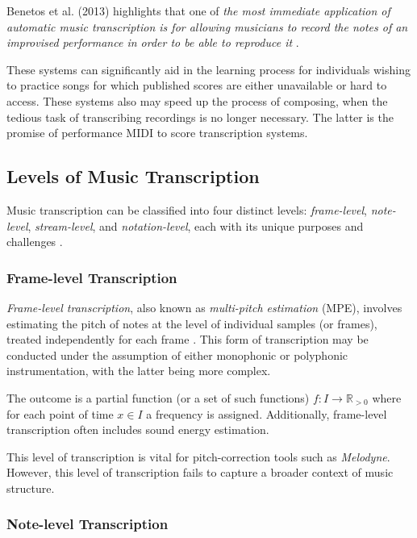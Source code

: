 Benetos et al. (2013) highlights that one of \emph{the most immediate application of automatic music transcription is for allowing musicians to record the notes of an improvised performance in order to be able to reproduce it} \cite{Benetos2013}.

These systems can significantly aid in the learning process for individuals wishing to practice songs for which published scores are either unavailable or hard to access. These systems also may speed up the process of composing, when the tedious task of transcribing recordings is no longer necessary. The latter is the promise of performance MIDI to score transcription systems.

\subsection{Levels of Music Transcription}

Music transcription can be classified into four distinct levels: \emph{frame-level}, \emph{note-level}, \emph{stream-level}, and \emph{notation-level}, each with its unique purposes and challenges \cite{Benetos2019}.

\subsubsection{Frame-level Transcription}

\emph{Frame-level transcription}, also known as \emph{multi-pitch estimation} (MPE), involves estimating the pitch of notes at the level of individual samples (or frames), treated independently for each frame \cite{Bhattarai2023}. This form of transcription may be conducted under the assumption of either monophonic or polyphonic instrumentation, with the latter being more complex.

The outcome is a partial function (or a set of such functions) $f\colon I\to\mathbb{R}_{>0}$ where for each point of time $x\in I$ a frequency is assigned. Additionally, frame-level transcription often includes sound energy estimation.

This level of transcription is vital for pitch-correction tools such as \emph{Melodyne}. However, this level of transcription fails to capture a broader context of music structure.

\subsubsection{Note-level Transcription}

